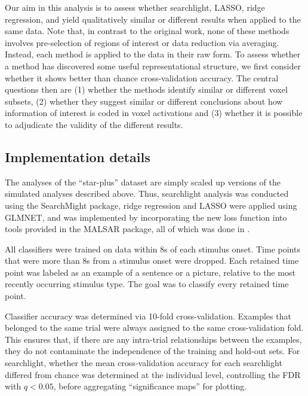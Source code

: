 
Our aim in this analysis is to assess whether searchlight, LASSO, ridge regression, and \soslasso yield qualitatively similar or different results when applied to the same data. Note that, in contrast to the original work, none of these methods involves pre-selection of regions of interest or data reduction via averaging. Instead, each method is applied to the data in their raw form. To assess whether a method has discovered some useful representational structure, we first consider whether it shows better than chance cross-validation accuracy. The central questions then are (1) whether the methods identify similar or different voxel subsets, (2) whether they suggest similar or different conclusions about how information of interest is coded in voxel activations and (3) whether it is possible to adjudicate the validity of the different results.

\subsection{Implementation details}
The analyses of the ``star-plus'' dataset are simply scaled up versions of the simulated analyses described above. Thus, searchlight analysis was conducted using the SearchMight package, ridge regression and LASSO were applied using GLMNET, and \soslasso was implemented by incorporating the new loss function into tools provided in the MALSAR package, all of which was done in \matlab. 

All classifiers were trained on data within 8s of each stimulus onset. Time points that were more than 8s from a stimulus onset were dropped. Each retained time point was labeled as an example of a sentence or a picture, relative to the most recently occurring stimulus type. The goal was to classify every retained time point.

Classifier accuracy was determined via 10-fold cross-validation. Examples that belonged to the same trial were always assigned to the same cross-validation fold. This ensures that, if there are any intra-trial relationships between the examples, they do not contaminate the independence of the training and hold-out sets. For searchlight, whether the mean cross-validation accuracy for each searchlight differed from chance was determined at the individual level, controlling the FDR with $q < 0.05$, before aggregating ``significance maps'' for plotting. 

